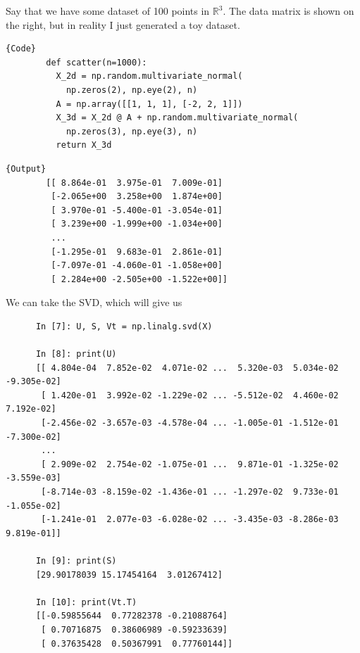   \begin{example}[Walkthrough]
    Say that we have some dataset of 100 points in $\mathbb{R}^3$. The data matrix is shown on the right, but in reality I just generated a toy dataset. 

    \noindent\begin{minipage}{.5\textwidth}
      \begin{lstlisting}[]{Code}
        def scatter(n=1000): 
          X_2d = np.random.multivariate_normal(
            np.zeros(2), np.eye(2), n) 
          A = np.array([[1, 1, 1], [-2, 2, 1]])
          X_3d = X_2d @ A + np.random.multivariate_normal(
            np.zeros(3), np.eye(3), n)
          return X_3d
      \end{lstlisting}
      \end{minipage}
      \hfill
      \begin{minipage}{.49\textwidth}
      \begin{lstlisting}[]{Output}
        [[ 8.864e-01  3.975e-01  7.009e-01]
         [-2.065e+00  3.258e+00  1.874e+00]
         [ 3.970e-01 -5.400e-01 -3.054e-01]
         [ 3.239e+00 -1.999e+00 -1.034e+00]
         ...
         [-1.295e-01  9.683e-01  2.861e-01]
         [-7.097e-01 -4.060e-01 -1.058e+00]
         [ 2.284e+00 -2.505e+00 -1.522e+00]]
      \end{lstlisting}
    \end{minipage}

    We can take the SVD, which will give us

    \begin{lstlisting}
      In [7]: U, S, Vt = np.linalg.svd(X)

      In [8]: print(U)
      [[ 4.804e-04  7.852e-02  4.071e-02 ...  5.320e-03  5.034e-02 -9.305e-02]
       [ 1.420e-01  3.992e-02 -1.229e-02 ... -5.512e-02  4.460e-02  7.192e-02]
       [-2.456e-02 -3.657e-03 -4.578e-04 ... -1.005e-01 -1.512e-01 -7.300e-02]
       ...
       [ 2.909e-02  2.754e-02 -1.075e-01 ...  9.871e-01 -1.325e-02 -3.559e-03]
       [-8.714e-03 -8.159e-02 -1.436e-01 ... -1.297e-02  9.733e-01 -1.055e-02]
       [-1.241e-01  2.077e-03 -6.028e-02 ... -3.435e-03 -8.286e-03  9.819e-01]]

      In [9]: print(S)
      [29.90178039 15.17454164  3.01267412]

      In [10]: print(Vt.T)
      [[-0.59855644  0.77282378 -0.21088764]
       [ 0.70716875  0.38606989 -0.59233639]
       [ 0.37635428  0.50367991  0.77760144]] 
    \end{lstlisting} 


\end{example}
